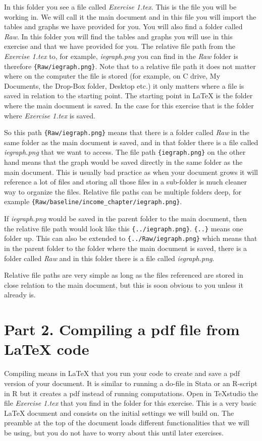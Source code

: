 \documentclass[12pts]{report}
\begin{document}
In this folder you see a file called \emph{Exercise 1.tex}. This is the file you will be working in. We will call it the main document and in this file you will import the tables and graphs we have provided for you. You will also find a folder called \emph{Raw}. In this folder you will find the tables and graphs you will use in this exercise and that we have provided for you. The relative file path from the \emph{Exercise 1.tex} to, for example, \emph{iegraph.png} you can find in the \emph{Raw} folder is therefore \verb|{Raw/iegraph.png}|. Note that to a relative file path it does not matter where on the computer the file is stored (for example, on C drive, My Documents, the Drop-Box folder, Desktop etc.) it only matters where a file is saved in relation to the starting point. The starting point in {\LaTeX} is the folder where the main document is saved. In the case for this exercise that is the folder where \emph{Exercise 1.tex} is saved.

So this path \verb|{Raw/iegraph.png}| means that there is a folder called \emph{Raw} in the same folder as the main document is saved, and in that folder there is a file called \emph{iegraph.png} that we want to access. The file path \verb|{iegraph.png}| on the other hand means that the graph would be saved directly in the same folder as the main document. This is usually bad practice as when your document grows it will reference a lot of files and storing all those files in a sub-folder is much cleaner way to organize the files. Relative file paths can be multiple folders deep, for example \verb|{Raw/baseline/income_chapter/iegraph.png}|. 

If \emph{iegraph.png} would be saved in the parent folder to the main document, then the relative file path would look like this \verb|{../iegraph.png}|. \verb|{..}| means one folder up. This can also be extended to \verb|{../Raw/iegraph.png}| which means that in the parent folder to the folder where the main document is saved, there is a folder called \emph{Raw} and in this folder there is a file called \emph{iegraph.png}.

Relative file paths are very simple as long as the files referenced are stored in close relation to the main document, but this is soon obvious to you unless it already is.

\section*{Part 2. Compiling a pdf file from  {\LaTeX} code}
Compiling means in {\LaTeX} that you run your code to create and save a pdf version of your document. It is similar to running a do-file in Stata or an R-script in R but it creates a pdf instead of running computations. Open in TeXstudio the file \emph{Exercise 1.tex} that you find in the folder for this exercise. This is a very basic {\LaTeX} document and consists on the initial settings we will build on. The preamble at the top of the document loads different functionalities that we will be using, but you do not have to worry about this until later exercises.
\end{document}
